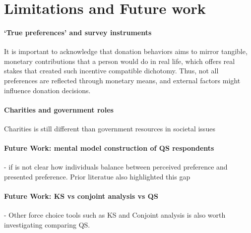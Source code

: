 \section{Limitations and Future work}
\label{sec:limitations}

\paragraph{`True preferences' and survey instruments}
It is important to acknowledge that donation behaviors aims to mirror tangible, monetary contributions that a person would do in real life, which offers real stakes that created such incentive compatible dichotomy. Thus, not all preferences are reflected through monetary means, and external factors might influence donation decisions.

\paragraph{Charities and government roles}
Charities is still different than government resources in societal issues

\paragraph{Future Work: mental model construction of QS respondents}
- if is not clear how individuals balance between perceived preference and presented preference. Prior literatue also highlighted this gap

\paragraph{Future Work: KS vs conjoint analysis vs QS}
- Other force choice tools such as  KS and Conjoint analysis is also worth investigating comparing QS.










